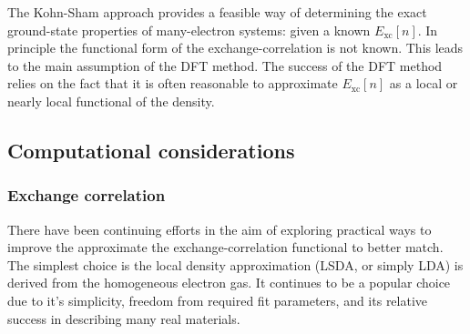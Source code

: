 The Kohn-Sham approach provides a feasible way of determining the exact ground-state
properties of many-electron systems: given a known $E_\text{xc}[n]$. In principle the
functional form of the exchange-correlation is not known. This leads to the main
assumption of the DFT method. The success of the DFT method relies on the fact that
it is often reasonable to approximate $E_\text{xc}[n]$ as a local or nearly local
functional of the density. 

\subsection{Computational considerations}


\subsubsection{Exchange correlation}

There have been continuing efforts in the aim of exploring practical ways to improve
the approximate the exchange-correlation functional to better match. The simplest
choice is the local density approximation (LSDA, or simply LDA) is derived from the
homogeneous electron gas. It continues to be a popular choice due to it's simplicity,
freedom from required fit parameters, and its relative success in describing many
real materials.

